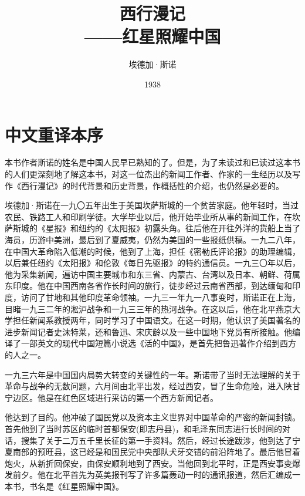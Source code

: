 \documentclass[10pt]{book}
\begin{document}
\title{西行漫记\\ \small{——红星照耀中国}}

\author{埃德加·斯诺}

\date{1938}


\maketitle
\thispagestyle{empty}


\tableofcontents
\thispagestyle{empty}
\newpage


\thispagestyle{empty}

\chapter*{中文重译本序}


本书作者斯诺的姓名是中国人民早已熟知的了。但是，为了未读过和已读过这本书的人们更深刻地了解这本书，对这一位杰出的新闻工作者、作家的一生经历以及写作《西行漫记》的时代背景和历史背景，作概括性的介绍，也仍然是必要的。

埃德加·斯诺在一九〇五年出生于美国坎萨斯城的一个贫苦家庭。他年轻时，当过农民、铁路工人和印刷学徒。大学毕业以后，他开始毕业所从事的新闻工作，在坎萨斯城的《星报》和纽约的《太阳报》初露头角。往后他在开往外洋的货船上当了海员，历游中美洲，最后到了夏威夷，仍然为美国的一些报纸供稿。一九二八年，在中国大革命陷入低潮的时候，他到了上海，担任《密勒氏评论报》的助理编辑，以后兼任纽约《太阳报》和伦敦《每日先驱报》的特约通信员。一九三〇年以后，他为采集新闻，遍访中国主要城市和东三省、内蒙古、台湾以及日本、朝鲜、荷属东印度。他在中国西南各省作长时间的旅行，徒步经过云南省西部，到达缅甸和印度，访问了甘地和其他印度革命领袖。一九三一年九一八事变时，斯诺正在上海，目睹一九三二年的淞沪战争和一九三三年的热河战争。在这以后，他在北平燕京大学担任新闻系教授两年，同时学习了中国语文。在这一时期，他认识了美国著名的进步新闻记者史沫特莱，还和鲁迅、宋庆龄以及一些中国地下党员有所接触。他编译了一部英文的现代中国短篇小说选《活的中国》，是首先把鲁迅著作介绍到西方的人之一。

一九三六年是中国国内局势大转变的关键性的一年。斯诺带了当时无法理解的关于革命与战争的无数问题，六月间由北平出发，经过西安，冒了生命危险，进入陕甘宁边区。他是在红色区域进行采访的第一个西方新闻记者。

他达到了目的。他冲破了国民党以及资本主义世界对中国革命的严密的新闻封锁。首先他到了当时苏区的临时首都保安(即志丹县)，和毛泽东同志进行长时间的对话，搜集了关于二万五千里长征的第一手资料。然后，经过长途跋涉，他到达了宁夏南部的预旺县，这已经是和国民党中央部队犬牙交错的前沿阵地了。最后他冒着炮火，从新折回保安，由保安顺利地到了西安。当他回到北平时，正是西安事变爆发前夕。他在北平首先为英美报刊写了许多篇轰动一时的通讯报道，然后汇编成一本书，书名是《红星照耀中国》。
\end{document}
